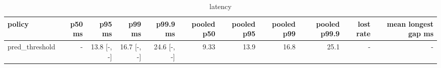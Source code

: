\begin{table}[t]\centering\small
\begin{tabular}{lrrrrrrrrrr}\toprule
policy & p50 ms & p95 ms & p99 ms & p99.9 ms & pooled p50 & pooled p95 & pooled p99 & pooled p99.9 & lost rate & mean longest gap ms \\\midrule
pred\_threshold & - & 13.8 [-, -] & 16.7 [-, -] & 24.6 [-, -] & 9.33 & 13.9 & 16.8 & 25.1 & - & - \\
\bottomrule\end{tabular}\caption{latency}\end{table}
